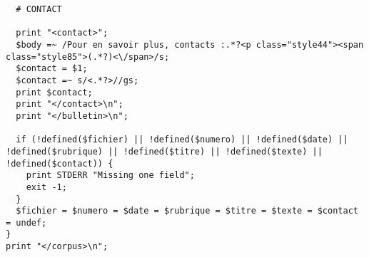 \begin{lstlisting}
  # CONTACT

  print "<contact>";
  $body =~ /Pour en savoir plus, contacts :.*?<p class="style44"><span class="style85">(.*?)<\/span>/s;
  $contact = $1;
  $contact =~ s/<.*?>//gs;
  print $contact;
  print "</contact>\n";
  print "</bulletin>\n";

  if (!defined($fichier) || !defined($numero) || !defined($date) || !defined($rubrique) || !defined($titre) || !defined($texte) || !defined($contact)) {
    print STDERR "Missing one field";
    exit -1;
  }
  $fichier = $numero = $date = $rubrique = $titre = $texte = $contact = undef;
}
print "</corpus>\n";
\end{lstlisting}
